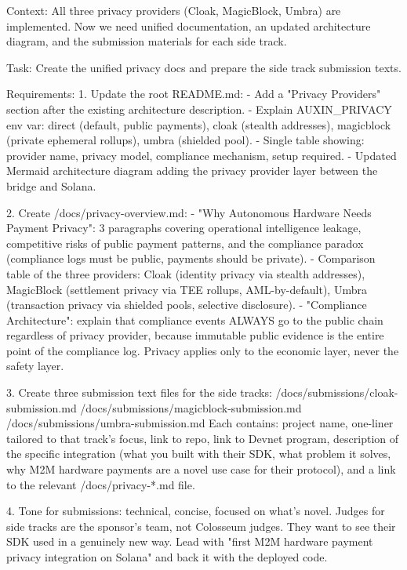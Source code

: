 \documentclass[11pt, a4paper]{article}
\begin{document}
\begin{promptbox}
Context: All three privacy providers (Cloak, MagicBlock, Umbra) are implemented. Now we need unified documentation, an updated architecture diagram, and the submission materials for each side track.

Task: Create the unified privacy docs and prepare the side track submission texts.

Requirements:
1. Update the root README.md:
   - Add a "Privacy Providers" section after the existing architecture description.
   - Explain AUXIN_PRIVACY env var: direct (default, public payments), cloak (stealth addresses), magicblock (private ephemeral rollups), umbra (shielded pool).
   - Single table showing: provider name, privacy model, compliance mechanism, setup required.
   - Updated Mermaid architecture diagram adding the privacy provider layer between the bridge and Solana.

2. Create /docs/privacy-overview.md:
   - "Why Autonomous Hardware Needs Payment Privacy": 3 paragraphs covering operational intelligence leakage, competitive risks of public payment patterns, and the compliance paradox (compliance logs must be public, payments should be private).
   - Comparison table of the three providers: Cloak (identity privacy via stealth addresses), MagicBlock (settlement privacy via TEE rollups, AML-by-default), Umbra (transaction privacy via shielded pools, selective disclosure).
   - "Compliance Architecture": explain that compliance events ALWAYS go to the public chain regardless of privacy provider, because immutable public evidence is the entire point of the compliance log. Privacy applies only to the economic layer, never the safety layer.

3. Create three submission text files for the side tracks:
   /docs/submissions/cloak-submission.md
   /docs/submissions/magicblock-submission.md
   /docs/submissions/umbra-submission.md
   Each contains: project name, one-liner tailored to that track's focus, link to repo, link to Devnet program, description of the specific integration (what you built with their SDK, what problem it solves, why M2M hardware payments are a novel use case for their protocol), and a link to the relevant /docs/privacy-*.md file.

4. Tone for submissions: technical, concise, focused on what's novel. Judges for side tracks are the sponsor's team, not Colosseum judges. They want to see their SDK used in a genuinely new way. Lead with "first M2M hardware payment privacy integration on Solana" and back it with the deployed code.
\end{promptbox}
\end{document}
